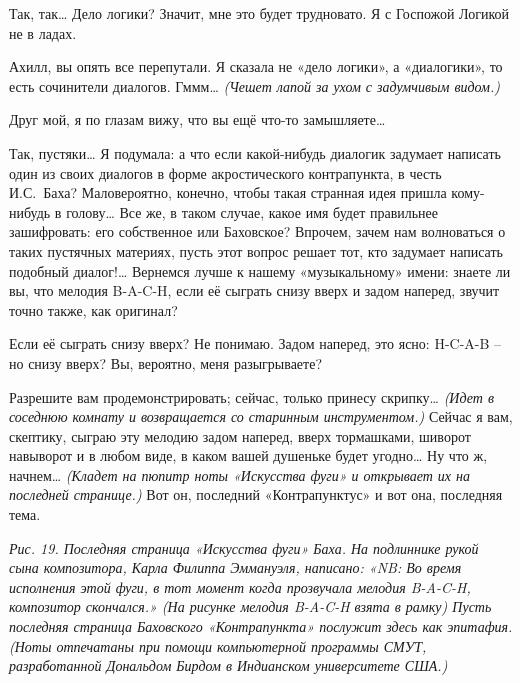 \documentclass[../main.tex]{subfiles}
\begin{document}
\begin{dialogue}
 Так, так\ldots{} Дело логики? Значит, мне это будет трудновато. Я с Госпожой Логикой не в ладах.

 Ахилл, вы опять все перепутали. Я сказала не «дело логики», а «диалогики», то есть сочинители диалогов. Гммм\ldots{} \emph{(Чешет лапой за ухом с задумчивым видом.)}

 Друг мой, я по глазам вижу, что вы ещё что-то замышляете\ldots{}

 Так, пустяки\ldots{} Я подумала: а что если какой-нибудь диалогик задумает написать один из своих диалогов в форме акростического контрапункта, в честь И.С.~Баха? Маловероятно, конечно, чтобы такая странная идея пришла кому-нибудь в голову\ldots{} Все же, в таком случае, какое имя будет правильнее зашифровать: его собственное или Баховское? Впрочем, зачем нам волноваться о таких пустячных материях, пусть этот вопрос решает тот, кто задумает написать подобный диалог!\ldots{} Вернемся лучше к нашему «музыкальному» имени: знаете ли вы, что мелодия \mbox{B-A-C-H}, если её сыграть снизу вверх и задом наперед, звучит точно также, как оригинал?

 Если её сыграть снизу вверх? Не понимаю. Задом наперед, это ясно: \mbox{H-C-A-B} \--- но снизу вверх? Вы, вероятно, меня разыгрываете?

 Разрешите вам продемонстрировать; сейчас, только принесу скрипку\ldots{} \emph{(Идет в соседнюю комнату и возвращается со старинным инструментом.)} Сейчас я вам, скептику, сыграю эту мелодию задом наперед, вверх тормашками, шиворот навыворот и в любом виде, в каком вашей душеньке будет угодно\ldots{} Ну что ж, начнем\ldots{} \emph{(Кладет на пюпитр ноты «Искусства фуги» и открывает их на последней странице.)} Вот он, последний «Контрапунктус» и вот она, последняя тема.


\emph{Рис. 19. Последняя страница «Искусства фуги» Баха. На подлиннике рукой сына композитора, Карла Филиппа Эммануэля, написано: «NB: Во время исполнения этой фуги, в тот момент когда прозвучала мелодия \mbox{B-A-C-H}, композитор скончался.» (На рисунке мелодия \mbox{B-A-C-H} взята в рамку) Пусть последняя страница Баховского «Контрапункта» послужит здесь как эпитафия. (Ноты отпечатаны при помощи компьютерной программы СМУТ, разработанной Дональдом Бирдом в Индианском университете США.)}

\end{dialogue}
\end{document}

